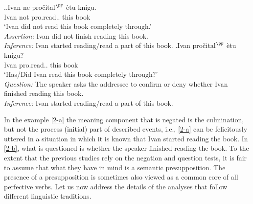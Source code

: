 \ex.\label{2}\ag.\label{2-a}Ivan ne pro\v{c}ital$^{\PF}$ \`{e}tu knigu.\\
Ivan not pro.read.. this book\\
\trans `Ivan did not read this book completely through.'\\
\textit{Assertion:} Ivan did not finish reading this book.\\
\textit{Inference:} Ivan started reading/read a part of this book.
\bg.\label{2-b}Ivan pro\v{c}ital$^{\PF}$ \`{e}tu knigu?\\
Ivan pro.read.. this book\\
\trans `Has/Did Ivan read this book completely through?'\\
\textit{Question:} The speaker asks the addressee to confirm or deny whether Ivan finished reading this book.\\
\textit{Inference:} Ivan started reading/read a part of this book.

In the example \ref{2-a} the meaning component that is negated is the culmination, but not the process (initial) part of described events, i.e., \ref{2-a} can be felicitously uttered in a situation in which it is known that Ivan started reading the book. In \ref{2-b}, what is questioned is whether the speaker finished reading the book. To the extent that the previous studies rely on the negation and question tests, it is fair to assume that what they have in mind is a semantic presupposition. The presence of a presupposition is sometimes \citep[e.g., by][]{Paducheva:96, Romanova:04} also viewed as a common core of all perfective verbs. Let us now address the details of the analyses that follow different linguistic traditions.


